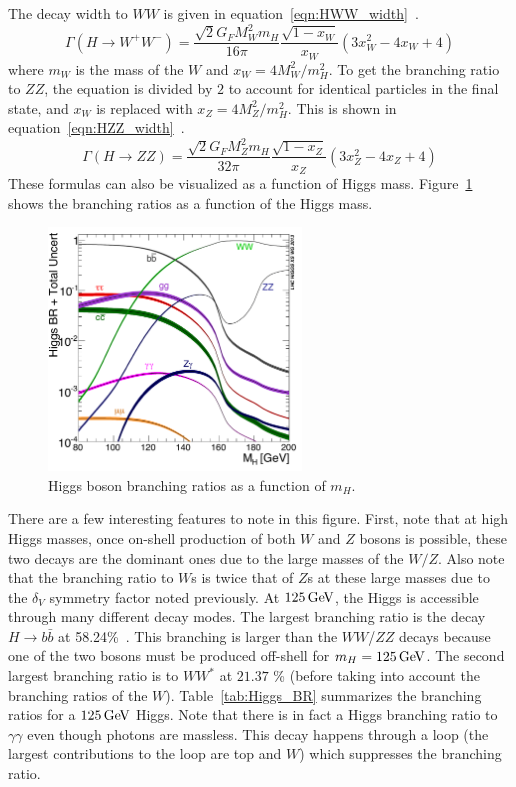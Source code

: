 The decay width to $WW$ is given in equation~\ref{eqn:HWW_width}~\cite{Tully}. 
%
\begin{equation}
\label{eqn:HWW_width}
\Gamma(H\to W^+W^-) = \frac{\sqrt{2} G_F M_W^2 m_H}{16\pi}\frac{\sqrt{1-x_W}}{x_W}\left(3x_W^2 - 4x_W + 4\right)
\end{equation}
%
where $m_W$ is the mass of the $W$ and $x_W  = 4M_W^2/m_H^2$. To get the branching ratio to $ZZ$, the equation is divided by $2$ to account for identical particles in the final state, and $x_W$ is replaced with $x_Z = 4M_Z^2/m_H^2$. This is shown in equation~\ref{eqn:HZZ_width}~\cite{Tully}.
%
\begin{equation}
\label{eqn:HZZ_width}
\Gamma(H\to ZZ) = \frac{\sqrt{2} G_F M_Z^2 m_H}{32\pi}\frac{\sqrt{1-x_Z}}{x_Z}\left(3x_Z^2 - 4x_Z + 4\right)
\end{equation}
%
These formulas can also be visualized as a function of Higgs mass. Figure~\ref{fig:branching_ratios} shows the branching ratios as a function of the Higgs mass. 
%
\begin{figure}[h!]
  \centering
  \captionsetup{justification=centering}
  \includegraphics[width=0.6\textwidth]{figures/Higgs_BR}
  \caption{Higgs boson branching ratios as a function of $m_H$\cite{LHCXSWG}.}
  \label{fig:branching_ratios}
\end{figure}
%
There are a few interesting features to note in this figure. First, note that at high Higgs masses, once on-shell production of both $W$ and $Z$ bosons is possible, these two decays are the dominant ones due to the large masses of the $W/Z$. Also note that the branching ratio to $W$s is twice that of $Z$s at these large masses due to the $\delta_V$ symmetry factor noted previously. At $125 \GeV$, the Higgs is accessible through many different decay modes. The largest branching ratio is the decay $H\to b\bar{b}$ at 58.24\%~\cite{LHCXSWG}. This branching is larger than the $WW$/$ZZ$ decays because one of the two bosons must be produced off-shell for $m_H = 125 \GeV$. The second largest branching ratio is to $WW^*$ at $21.37$ \% (before taking into account the branching ratios of the $W$). Table~\ref{tab:Higgs_BR} summarizes the branching ratios for a $125 \GeV$ Higgs. Note that there is in fact a Higgs branching ratio to $\gamma\gamma$ even though photons are massless. This decay happens through a loop (the largest contributions to the loop are top and $W$) which suppresses the branching ratio. 

